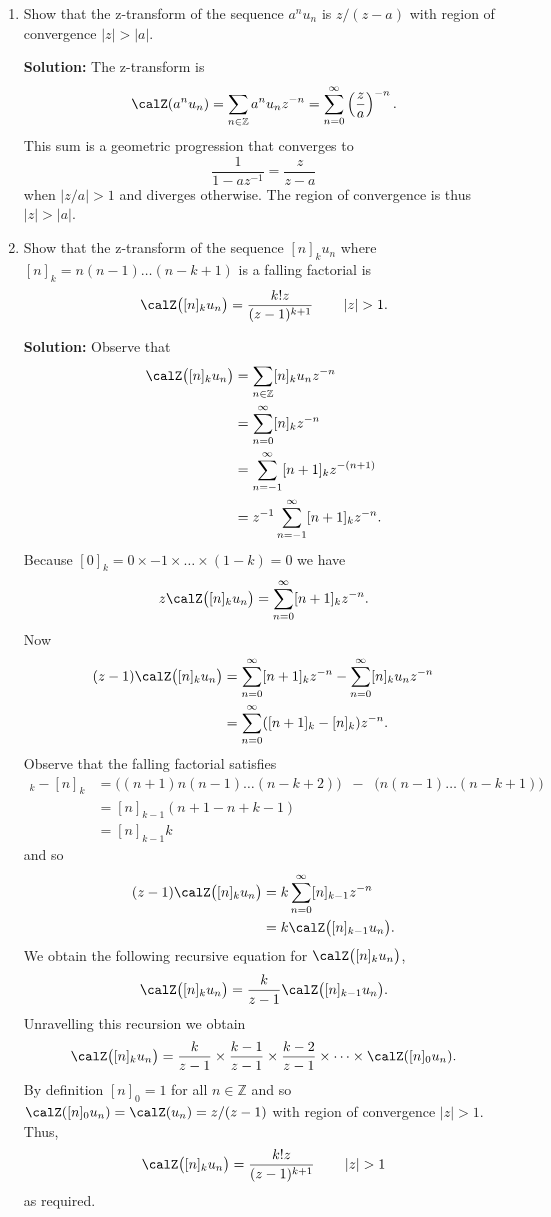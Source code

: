 \documentclass[11pt,a4paper]{book}
\theoremstyle{plain}
\numberwithin{equation}{section}
\newcommand{\ints}{{\mathbb Z}}
\newcommand{\abs}[1]{\left\vert #1 \right\vert}
\newenvironment{solution}{\begin{footnotesize}\textbf{Solution:}}{\end{footnotesize}}
\newenvironment{excersizelist}{%
  \renewcommand*{\theenumi}{\thechapter.\arabic{enumi}}%
  \newcommand\itemadvanced{\stepcounter{enumi}\item[$\ast$\, \theenumi.]}
  \begin{enumerate}
}{%
  \end{enumerate}
}
\begin{document}
\begin{excersizelist}
\item \label{exer:stepseqZtrans} Show that the z-transform of the sequence  $a^nu_n$ is $z/(z-a)$ with region of convergence $\abs{z} > \abs{a}$.
\begin{solution}
The z-transform is
\[
\calZ(a^nu_n) = \sum_{n \in \ints} a^n u_n z^{-n} = \sum_{n=0}^\infty \left(\frac{z}{a}\right)^{-n}.
\]
This sum is a geometric progression that converges to 
\[
\frac{1}{1- a z^{-1}} = \frac{z}{ z-a}
\]
when $\abs{z/a} > 1$ and diverges otherwise.  The region of convergence is thus $\abs{z} > \abs{a}$.
\end{solution}

\item \label{exer:fallingfacztransform} Show that the z-transform of the sequence $[n]_k u_n$ where $[n]_k = n(n-1)\dots(n-k+1)$ is a falling factorial is
\[
\calZ\big( [n]_k u_n  \big) = \frac{k! z }{(z - 1)^{k+1}} \qquad \abs{z} > 1.
\]
\begin{solution}
Observe that
\begin{align*}
\calZ\big( [n]_{k} u_n  \big) &= \sum_{n\in\ints} [n]_k u_n z^{-n} \\ 
&= \sum_{n=0}^\infty [n]_k z^{-n} \\ 
&= \sum_{n=-1}^\infty [n+1]_k z^{-(n+1)} \\
&= z^{-1} \sum_{n=-1}^\infty [n+1]_k z^{-n}.
\end{align*}
Because $[0]_k = 0 \times -1 \times \dots \times (1-k)= 0$ we have
\[
z \calZ\big( [n]_{k} u_n  \big) = \sum_{n=0}^\infty [n+1]_k z^{-n}.
\]  
Now
\begin{align*}
(z - 1) \calZ\big( [n]_{k} u_n  \big) &= \sum_{n=0}^\infty [n+1]_k z^{-n} - \sum_{n=0}^\infty [n]_k u_n z^{-n} \\
&= \sum_{n=0}^\infty ([n+1]_k - [n]_k) z^{-n}.
\end{align*}
Observe that the falling factorial satisfies
\begin{align*}
[n+1]_k - [n]_k &= \big( (n+1)n(n-1)\dots(n-k+2) \big) \;\;  - \;\; \big(n(n-1)\dots(n-k+1)\big) \\
&= [n]_{k-1}(n+1 - n+k-1) \\
&= [n]_{k-1} k
\end{align*}
and so
\begin{align*}
(z - 1) \calZ\big( [n]_{k} u_n  \big) &= k \sum_{n=0}^\infty  [n]_{k-1} z^{-n} \\
&= k \calZ\big( [n]_{k-1} u_n  \big).
\end{align*}
We obtain the following recursive equation for $\calZ\big( [n]_{k} u_n  \big)$,
\[
\calZ\big( [n]_{k} u_n  \big) = \frac{k}{z-1} \calZ\big( [n]_{k-1} u_n  \big).
\]
Unravelling this recursion we obtain
\[
\calZ\big( [n]_{k} u_n  \big) = \frac{k}{z-1} \times \frac{k-1}{z-1} \times \frac{k-2}{z-1} \times \dots \times \calZ( [n]_0 u_n ).
\]
By definition $[n]_0 = 1$ for all $n \in \ints$ and so $\calZ( [n]_0 u_n ) = \calZ( u_n ) = z/(z-1)$ with region of convergence $\abs{z} >1$.  Thus,
\[
\calZ\big( [n]_{k} u_n  \big) = \frac{k! z}{(z-1)^{k+1}} \qquad \abs{z} > 1
\]
as required.
\end{solution}


\end{excersizelist}
\end{document}
